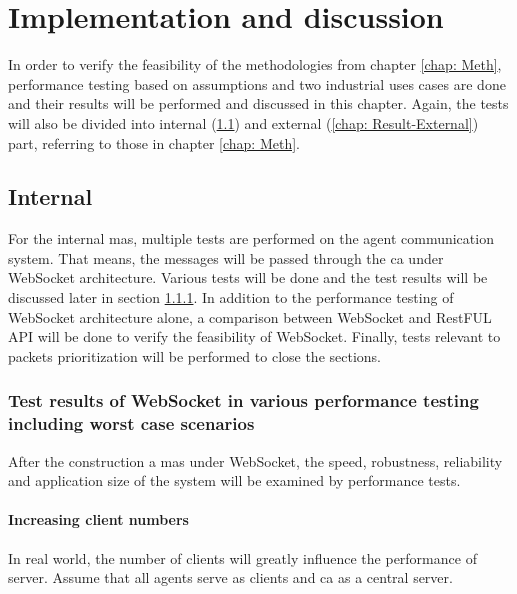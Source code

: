 \chapter{Implementation and discussion} \label{chap: Result}

In order to verify the feasibility of the methodologies from chapter \ref{chap: Meth}, 
performance testing based on assumptions and two industrial uses cases 
are done and their results will be performed and discussed in this chapter. 
Again, the tests will also be divided into internal (\ref{chap: Result-Internal}) 
and external (\ref{chap: Result-External}) part, referring to those in chapter \ref{chap: Meth}.

\section{Internal}\label{chap: Result-Internal}
For the internal \gls{mas}, multiple tests are performed on the agent 
communication system. That means, the messages 
will be passed through the \gls{ca} under WebSocket architecture. 
Various tests will be done and the test results will be discussed later in section 
\ref{chap: Result-WS}. 
In addition to the performance testing of WebSocket architecture alone, 
a comparison between WebSocket and RestFUL API will be done to verify the feasibility 
of WebSocket. 
Finally, tests relevant to packets prioritization will be performed to close 
the sections. 


\subsection{Test results of WebSocket in various performance testing including worst case scenarios} \label{chap: Result-WS}

After the construction a \gls{mas} under WebSocket, the speed, robustness, 
reliability and application size of the system will be examined by 
performance tests. 

\subsubsection{Increasing client numbers}
In real world, the number of clients will greatly influence the performance of 
server. Assume that all agents serve as clients and \gls{ca} as a central server. 
  

